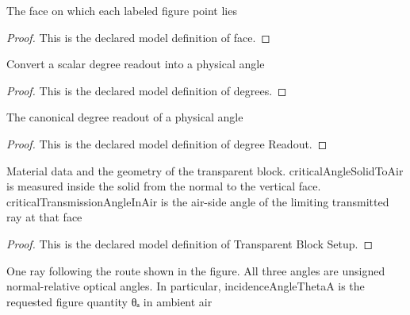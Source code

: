 \begin{definition}[face]
  \label{def:physics:phyx-mini-0096:phyxminiproblems-problemphyxmini0096-figurepoint-face}
  The face on which each labeled figure point lies
\end{definition}
\begin{proof}
  This is the declared model definition of face.
\end{proof}
\begin{definition}[degrees]
  \label{def:physics:phyx-mini-0096:phyxminiproblems-problemphyxmini0096-degrees}
  Convert a scalar degree readout into a physical angle
\end{definition}
\begin{proof}
  This is the declared model definition of degrees.
\end{proof}
\begin{definition}
  \label{def:physics:phyx-mini-0096:phyxminiproblems-problemphyxmini0096-degreereadout}
  The canonical degree readout of a physical angle
\end{definition}
\begin{proof}
  This is the declared model definition of degree Readout.
\end{proof}
\begin{definition}
  \label{def:physics:phyx-mini-0096:phyxminiproblems-problemphyxmini0096-transparentblocksetup}
  Material data and the geometry of the transparent block. criticalAngleSolidToAir is measured inside the solid from the normal to the vertical face. criticalTransmissionAngleInAir is the air-side angle of the limiting transmitted ray at that face
\end{definition}
\begin{proof}
  This is the declared model definition of Transparent Block Setup.
\end{proof}
\begin{definition}
  \label{def:physics:phyx-mini-0096:phyxminiproblems-problemphyxmini0096-blockraypath}
  One ray following the route shown in the figure. All three angles are unsigned normal-relative optical angles. In particular, incidenceAngleThetaA is the requested figure quantity θₐ in ambient air
\end{definition}
